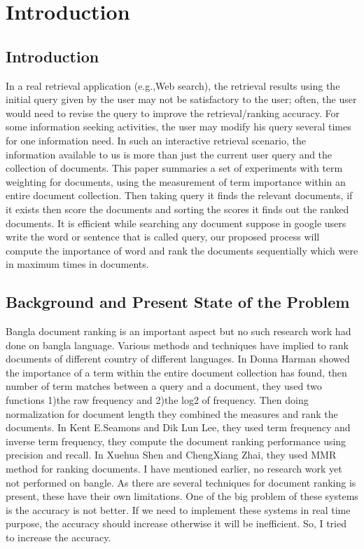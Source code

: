 \chapter{Introduction}
\label{Ch_Chapter1}

\section{Introduction}

In a real retrieval application (e.g.,Web search), the retrieval results using the initial query given by the user may not be satisfactory to the user; often, the user would need to revise the query to improve the retrieval/ranking accuracy. For some information seeking activities, the user may modify his query several times for one information need. In such an interactive retrieval scenario, the information available to us is more than just the current user query and the collection of documents. This paper summaries a set of experiments with term weighting for documents, using the measurement of term importance within an entire document collection. Then taking query it finds the relevant documents, if it exists then score the documents and sorting the scores it finds out the ranked documents. It is efficient while searching any document suppose in google users write the word or sentence that is called query, our proposed process will compute the importance of  word and rank the documents sequentially which were in maximum times in documents.

\section{Background and Present State of the Problem}

Bangla document ranking is an important aspect but no such research work had done on bangla language. Various methods and techniques have implied to rank documents of different country of different languages. In \cite{harman1986experimental} Donna Harman showed the importance of a term within the entire document collection has found, then number of term matches between a query and a document, they used two functions 1)the raw frequency and 2)the  log2  of frequency. Then doing normalization for document length they combined the measures and rank the documents. In \cite{lee1997document}Kent E.Seamons and Dik Lun Lee, they used term frequency and inverse term frequency, they compute the document ranking performance using precision and recall. In \cite{carbonell1998use} Xuehua Shen and ChengXiang Zhai, they used MMR method for ranking documents.
I have mentioned earlier, no research work yet not performed on bangle.  As there are several techniques for document ranking is present, these have their own limitations. One of the big problem of these systems is the accuracy is 	not better. If we need to implement these systems in real time purpose, the accuracy should increase otherwise it will be inefficient. So, I tried to increase the accuracy.


